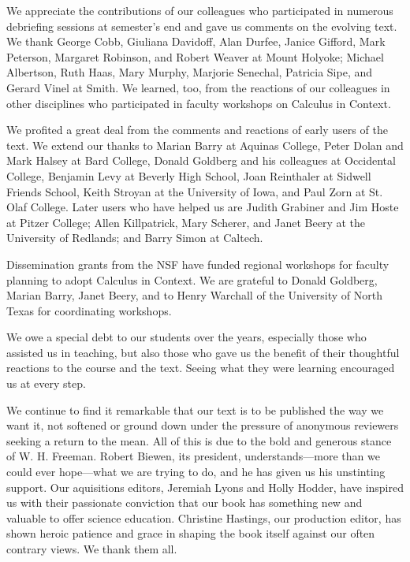 We appreciate the contributions of our colleagues who participated in
numerous debriefing sessions at semester's end and gave us comments on
the evolving text.  We thank George Cobb, Giuliana Davidoff, Alan
Durfee, Janice Gifford, Mark Peterson, Margaret Robinson, and Robert
Weaver at Mount Holyoke; Michael Albertson, Ruth Haas, Mary Murphy,
Marjorie Senechal, Patricia Sipe, and Gerard Vinel at Smith.  We
learned, too, from the reactions of our colleagues in other
disciplines who participated in faculty workshops on Calculus in
Context.

We profited a great deal from the comments and reactions of early
users of the text.  We extend our thanks to Marian Barry at Aquinas
College, Peter Dolan and Mark Halsey at Bard College, Donald Goldberg
and his colleagues at Occidental College, Benjamin Levy at Beverly
High School, Joan Reinthaler at Sidwell Friends School, Keith Stroyan
at the University of Iowa, and Paul Zorn at St. Olaf College.  Later
users who have helped us are Judith Grabiner and Jim Hoste at Pitzer
College; Allen Killpatrick, Mary Scherer, and Janet Beery at the
University of Redlands; and Barry Simon at Caltech.

Dissemination grants from the NSF have funded regional workshops for
faculty planning to adopt Calculus in Context.  We are grateful to
Donald Goldberg, Marian Barry, Janet Beery, and to Henry Warchall of
the University of North Texas for coordinating workshops.

We owe a special debt to our students over the years, especially those
who assisted us in teaching, but also those who gave us the benefit of
their thoughtful reactions to the course and the text.  Seeing what
they were learning encouraged us at every step.

We continue to find it remarkable that our text is to be published the
way we want it, not softened or ground down under the pressure of
anonymous reviewers seeking a return to the mean.  All of this is due
to the bold and generous stance of W. H. Freeman.  Robert Biewen, its
president, understands---more than we could ever hope---what we are
trying to do, and he has given us his unstinting support.  Our
aquisitions editors, Jeremiah Lyons and Holly Hodder, have inspired us
with their passionate conviction that our book has something new and
valuable to offer science education.  Christine Hastings, our
production editor, has shown heroic patience and grace in shaping the
book itself against our often contrary views.  We thank them all.


